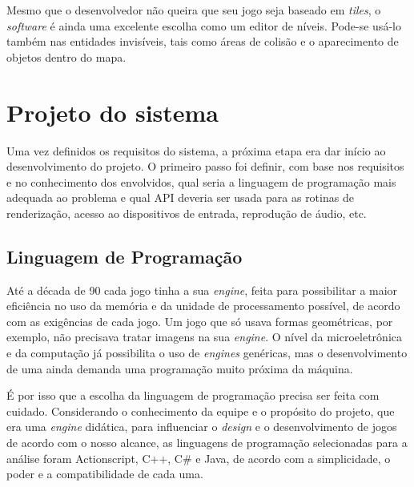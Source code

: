 %
\par
Mesmo que o desenvolvedor não queira que seu jogo seja baseado em \textit{tiles}, o \textit{software} é ainda uma excelente escolha como um editor de níveis. Pode-se usá-lo também nas entidades invisíveis, tais como áreas de colisão e o aparecimento de objetos dentro do mapa. 
%
%
%
%
\section{Projeto do sistema}
%
Uma vez definidos os requisitos do sistema, a próxima etapa era dar início ao desenvolvimento do projeto. O primeiro passo foi definir, com base nos requisitos e no conhecimento dos envolvidos, qual seria a linguagem de programação mais adequada ao problema e qual API deveria ser usada para as rotinas de renderização, acesso ao dispositivos de entrada, reprodução de áudio, etc.
%
%
\subsection{Linguagem de Programação}
\label{linguagem}
%
Até a década de 90 cada jogo tinha a sua \textit{engine}, feita para possibilitar a maior eficiência no uso da memória e da unidade de processamento possível, de acordo com as exigências de cada jogo. Um jogo que só usava formas geométricas, por exemplo, não precisava tratar imagens na sua \textit{engine}. O nível da microeletrônica e da computação já possibilita o uso de \textit{engines} genéricas, mas o desenvolvimento de uma ainda demanda uma programação muito próxima da máquina. 
\par
É por isso que a escolha da linguagem de programação precisa ser feita com cuidado. Considerando o conhecimento da equipe e o propósito do projeto, que era uma \textit{engine} didática, para influenciar o \textit{design} e o desenvolvimento de jogos de acordo com o nosso alcance, as linguagens de programação selecionadas para a análise foram Actionscript, C++, C\# e Java, de acordo com a simplicidade, o poder e a compatibilidade de cada uma.
%
